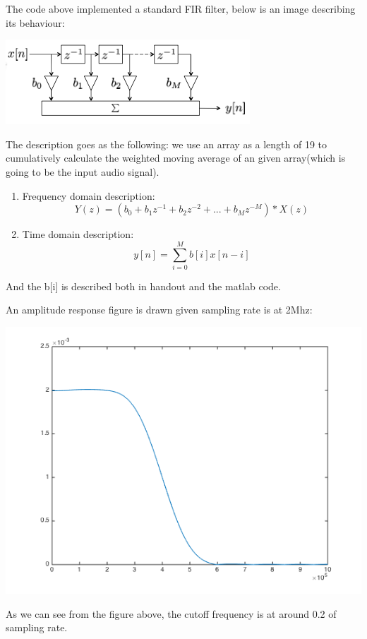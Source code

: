 \documentclass[11pt]{scrartcl}
\begin{document}
The code above implemented a standard FIR filter, below is an image describing its behaviour:

\begin{center}
\begin{minipage}[t]{\linewidth}

{
\includegraphics[scale = 1]{fir.png}
}
\end{minipage}
\medskip
\end{center}

The description goes as the following: we use an array as a length of 19 to cumulatively calculate the weighted moving average of an given array(which is going to be the input audio signal).\\


\begin{enumerate}
  \item Frequency domain description:
    $$Y(z) = (b_0 + b_1z^{-1} + b_2z^{-2} + ... +b_Mz^{-M})*X(z)$$

  \item Time domain description:
  $$y[n] = \sum^{M}_{i=0}b[i]x[n-i]$$
\end{enumerate}

And the b[i] is described both in handout and the matlab code.

An amplitude response figure is drawn given sampling rate is at 2Mhz:
\begin{center}
\begin{minipage}[t]{\linewidth}
\label{fig:test}
{
\includegraphics[scale = 0.7]{response.png}
\label{fig:tk}

}
\end{minipage}
\medskip
\end{center}

As we can see from the figure above, the cutoff frequency is at around 0.2 of sampling rate.

\end{document}
